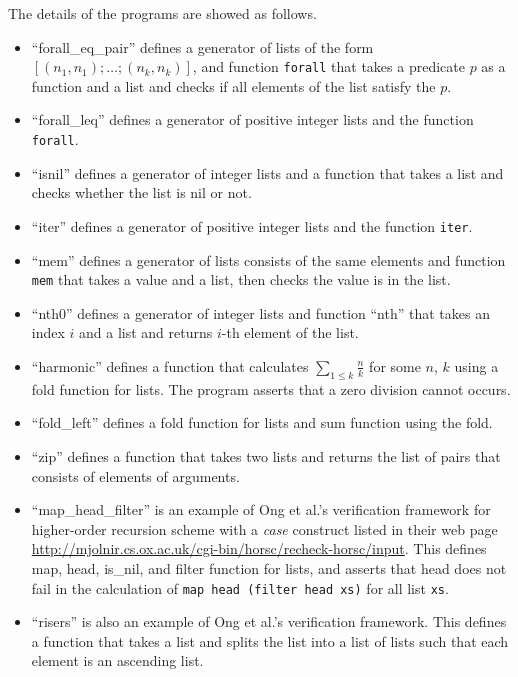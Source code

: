 The details of the programs are showed as follows.
\begin{itemize}
\item ``forall\_eq\_pair'' defines a generator of lists of the form
      $[(n_1,n_1);\dots;(n_k,n_k)]$, and function \texttt{forall} that
      takes a predicate $p$ as a function and a list and checks if all
      elements of the list satisfy the $p$.
\item ``forall\_leq'' defines a generator of positive integer lists and
      the function \texttt{forall}.
\item ``isnil'' defines a generator of integer lists and a function that
      takes a list and checks whether the list is nil or not.
\item ``iter'' defines a generator of positive integer lists and the
      function \texttt{iter}.
\item ``mem'' defines a generator of lists consists of the same elements
      and function \texttt{mem} that takes a value and a list, then
      checks the value is in the list.
\item ``nth0'' defines a generator of integer lists and function
      ``nth'' that takes an index $i$ and a list and returns $i$-th element of the list.
\item ``harmonic'' defines a function that calculates $\sum_{1 \leq k}
      \frac{n}{k}$ for some $n$, $k$ using a fold function for lists.
      The program asserts that a zero division cannot occurs.
\item ``fold\_left'' defines a fold function for lists and sum function
      using the fold.
\item ``zip'' defines a function that takes two lists and returns the
      list of pairs that consists of elements of arguments.
\item ``map\_head\_filter'' is an example of Ong et al.'s verification
      framework\cite{} for higher-order recursion scheme with a
      \textit{case} construct listed in their web page
      \url{http://mjolnir.cs.ox.ac.uk/cgi-bin/horsc/recheck-horsc/input}.
      This defines map, head, is\_nil, and filter function for lists, and
      asserts that head does not fail in the calculation of \texttt{map
      head (filter head xs)} for all list \texttt{xs}.
\item ``risers'' is also an example of Ong et al.'s verification
      framework.  This defines a function that takes a list and splits
      the list into a list of lists such that each element is an
      ascending list.
\end{itemize}

